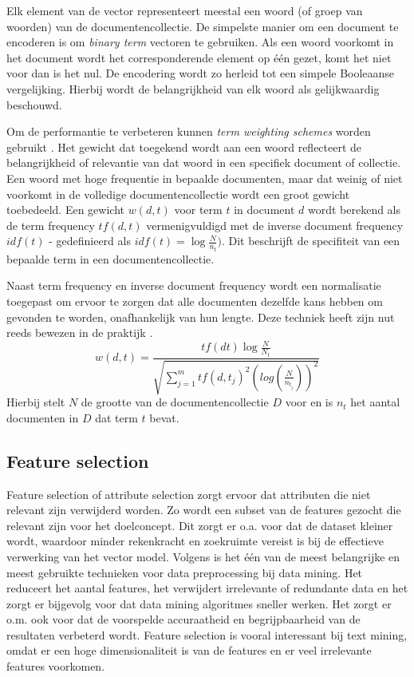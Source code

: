 Elk element van de vector representeert meestal een woord (of groep van woorden) van de documentencollectie. De simpelste manier om een document te encoderen is om \textit{binary term} vectoren te gebruiken. Als een woord voorkomt in het document wordt het corresponderende element op \'e\'en gezet, komt het niet voor dan is het nul. De encodering wordt zo herleid tot een simpele Booleaanse vergelijking. Hierbij wordt de belangrijkheid van elk woord als gelijkwaardig beschouwd. 

Om de performantie te verbeteren kunnen \textit{term weighting schemes} worden gebruikt \cite{Salton1988}. Het gewicht dat toegekend wordt aan een woord reflecteert de belangrijkheid of relevantie van dat woord in een specifiek document of collectie. Een woord met hoge frequentie in bepaalde documenten, maar dat weinig of niet voorkomt in de volledige documentencollectie wordt een groot gewicht toebedeeld. Een gewicht $w(d,t)$ voor term $t$ in document $d$ wordt berekend als de term frequency $tf(d,t)$ vermenigvuldigd met de inverse document frequency $idf(t)$ - gedefinieerd als $idf(t)=\log{\frac{N}{n_t}})$. Dit beschrijft de specifiteit van een bepaalde term in een documentencollectie. 

Naast term frequency en inverse document frequency wordt een normalisatie toegepast om ervoor te zorgen dat alle documenten dezelfde kans hebben om gevonden te worden, onafhankelijk van hun lengte. Deze techniek heeft zijn nut reeds bewezen in de praktijk . 
\begin{equation}\label{eq:tfidf}
w(d,t) = \frac{tf(dt)\log{\frac{N}{N_t}}}{\sqrt{\sum_{j=1}^{m}tf(d,t_j)^2(log(\frac{N}{n_{t_j}}))^2}}
\end{equation}
Hierbij stelt $N$ de grootte van de documentencollectie $D$ voor en is $n_t$ het aantal documenten in $D$ dat term $t$ bevat.

\subsection{Feature selection}
Feature selection of attribute selection zorgt ervoor dat attributen die niet relevant zijn verwijderd worden. Zo wordt een subset van de features gezocht die relevant zijn voor het doelconcept. Dit zorgt er o.a. voor dat de dataset kleiner wordt, waardoor minder rekenkracht en zoekruimte vereist is bij de effectieve verwerking van het vector model. Volgens \cite{Liu2005} is het \'e\'en van de meest belangrijke en meest gebruikte technieken voor data preprocessing bij data mining. Het reduceert het aantal features, het verwijdert irrelevante of redundante data en het zorgt er bijgevolg voor dat data mining algoritmes sneller werken. Het zorgt er o.m. ook voor dat de voorspelde accuraatheid en begrijpbaarheid van de resultaten verbeterd wordt. Feature selection is vooral interessant bij text mining, omdat er een hoge dimensionaliteit is van de features en er veel irrelevante features voorkomen.

